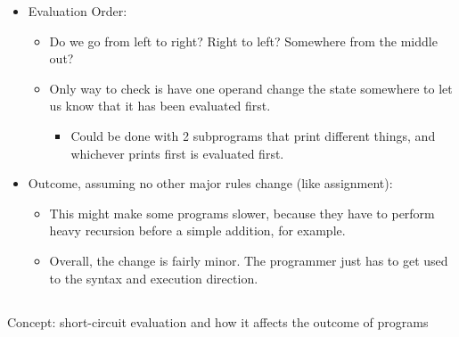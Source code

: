 \begin{itemize}
\item Evaluation Order:
  \begin{itemize}[noitemsep]
  \item Do we go from left to right? Right to left? Somewhere from the middle out?
  \item Only way to check is have one operand change the state somewhere to let us know that it has been evaluated first.
    \begin{itemize}[noitemsep]
    \item Could be done with 2 subprograms that print different things, and whichever prints first is evaluated first.
    \end{itemize}
  \end{itemize}

\item Outcome, assuming no other major rules change (like assignment):
  \begin{itemize}[noitemsep]
  \item This might make some programs slower, because they have to perform heavy recursion before a simple addition, for example.
  \item Overall, the change is fairly minor. The programmer just has to get used to the syntax and execution direction.
  \end{itemize}
\end{itemize}

\subsection{}
Concept: short-circuit evaluation and how it affects the outcome of programs

